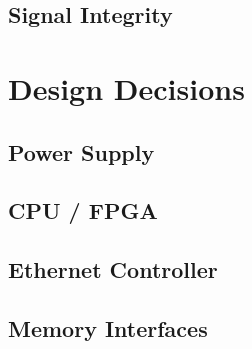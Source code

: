\documentclass[letterpaper, 11pt, twoside]{article}
\begin{document}
\paragraph{}

\subsection{Signal Integrity}
\paragraph{}

\cleardoublepage

\section{Design Decisions}
\paragraph{}

\subsection{Power Supply}
\paragraph{}

\subsection{CPU / FPGA}
\paragraph{}

\subsection{Ethernet Controller}
\paragraph{}

\subsection{Memory Interfaces}
\paragraph{}
\end{document}
